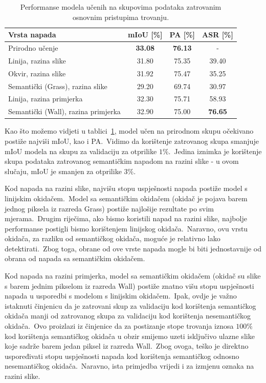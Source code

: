 \documentclass[times, utf8, seminar, numeric]{fer}
\begin{document}
\begin{table}[htb]
    \caption{Performanse modela učenih na skupovima podataka zatrovanim osnovnim pristupima trovanju.}
    \label{tbl:performanse_zatrovano}
    \centering
    \begin{tabular}{lccc} \hline
    Vrsta napada & mIoU [\%] & PA [\%] & ASR [\%] \\ \hline
    Prirodno učenje & \textbf{33.08} & \textbf{76.13} & - \\ \hline
    Linija, razina slike & 31.80 & 75.35 & 39.40 \\
    Okvir, razina slike & 31.92 & 75.47 & 35.25 \\
    Semantički (Grass), razina slike & 29.20 & 69.74 & 30.97 \\ \hline
    Linija, razina primjerka & 32.30 & 75.71 & 58.93 \\
    Semantički (Wall), razina primjerka & 32.90 & 75.00 & \textbf{76.65} \\ \hline
    \end{tabular}
\end{table}

Kao što možemo vidjeti u tablici~\ref{tbl:performanse_zatrovano}, model učen na prirodnom skupu očekivano postiže najviši mIoU, kao i PA.\ 
Vidimo da korištenje zatrovanog skupa smanjuje mIoU modela na skupu za validaciju za otprilike $1\%$.\ 
Jedina iznimka je korištenje skupa podataka zatrovanog semantičkim napadom na razini slike - u ovom slučaju, mIoU je smanjen za otprilike $3\%$.\ 
  
Kod napada na razini slike, najvišu stopu uspješnosti napada postiže model s linijskim okidačem.\ 
Model sa semantičkim okidačem (okidač je pojava barem jednog piksela iz razreda Grass) postiže najlošije rezultate po svim mjerama.\ 
Drugim riječima, ako bismo koristili napad na razini slike, najbolje performanse postigli bismo korištenjem linijskog okidača.\ 
Naravno, ovu vrstu okidača, za razliku od semantičkog okidača, moguće je relativno lako detektirati.\ 
Zbog toga, obrane od ove vrste napada mogle bi biti jednostavnije od obrana od napada sa semantičkim okidačem.\ 

Kod napada na razini primjerka, model sa semantičkim okidačem (okidač su slike s barem jednim pikselom iz razreda Wall) postiže znatno višu stopu uspješnosti napada u usporedbi s modelom s linijskim okidačem.\ 
Ipak, ovdje je važno istaknuti činjenicu da je zatrovani skup za validaciju kod korištenja semantičkog okidača manji od zatrovanog skupa za validaciju kod korištenja nesemantičkog okidača.\ 
Ovo proizlazi iz činjenice da za postizanje stope trovanja iznosa $100\%$ kod korištenja semantičkog okidača u obzir smijemo uzeti isključivo ulazne slike koje sadrže barem jedan piksel iz razreda Wall.\ 
Zbog ovoga, teško je direktno uspoređivati stopu uspješnosti napada kod korištenja semantičkog odnosno nesemantičkog okidača.\ 
Naravno, ista primjedba vrijedi i za izmjenu oznaka na razini slike.\ 
\end{document}
